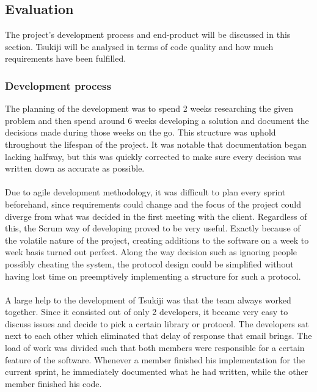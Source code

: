 \subsection{Evaluation}
\label{evaluation}
The project's development process and end-product will be discussed in this section.
Tsukiji will be analysed in terms of code quality and how much requirements have been fulfilled.

\subsubsection{Development process}
The planning of the development was to spend 2 weeks researching the given problem and then spend around 6 weeks developing a solution and document the decisions made during those weeks on the go.
This structure was uphold throughout the lifespan of the project.
It was notable that documentation began lacking halfway, but this was quickly corrected to make sure every decision was written down as accurate as possible.\\
\\
Due to agile development methodology, it was difficult to plan every sprint beforehand, since requirements could change and the focus of the project could diverge from what was decided in the first meeting with the client.
Regardless of this, the Scrum way of developing proved to be very useful.
Exactly because of the volatile nature of the project, creating additions to the software on a week to week basis turned out perfect. 
Along the way decision such as ignoring people possibly cheating the system, the protocol design could be simplified without having lost time on preemptively implementing a structure for such a protocol.\\
\\
A large help to the development of Tsukiji was that the team always worked together. 
Since it consisted out of only 2 developers, it became very easy to discuss issues and decide to pick a certain library or protocol.
The developers sat next to each other which eliminated that delay of response that email brings. 
The load of work was divided such that both members were responsible for a certain feature of the software.
Whenever a member finished his implementation for the current sprint, he immediately documented what he had written, while the other member finished his code.

